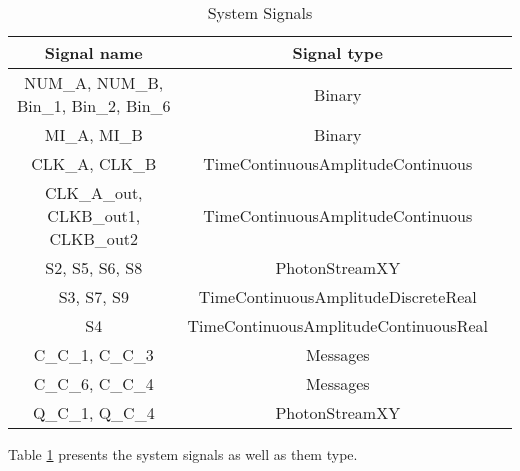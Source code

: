 \begin{refsection}
\begin{table}[H]
\centering
\caption{System Signals}
\label{tb:signals}
\begin{tabular}{|c|c|c|}
\hline
\textbf{Signal name}                        & \textbf{Signal type}                      \\ \hline
NUM\_A, NUM\_B, Bin\_1, Bin\_2, Bin\_6      &  Binary                                   \\ \hline
MI\_A, MI\_B                                &  Binary                                   \\ \hline
CLK\_A, CLK\_B                              &  TimeContinuousAmplitudeContinuous        \\ \hline
CLK\_A\_out, CLKB\_out1, CLKB\_out2         &  TimeContinuousAmplitudeContinuous        \\ \hline
S2, S5, S6, S8                              &  PhotonStreamXY                           \\ \hline
S3, S7, S9                                  &  TimeContinuousAmplitudeDiscreteReal      \\ \hline
S4                                          &  TimeContinuousAmplitudeContinuousReal      \\ \hline
C\_C\_1, C\_C\_3                            &  Messages                                 \\ \hline
C\_C\_6, C\_C\_4                            &  Messages                                 \\ \hline
Q\_C\_1, Q\_C\_4                            &  PhotonStreamXY                           \\ \hline

\end{tabular}
\end{table}

Table \ref{tb:signals} presents the system signals as well as them type.


\end{refsection}
